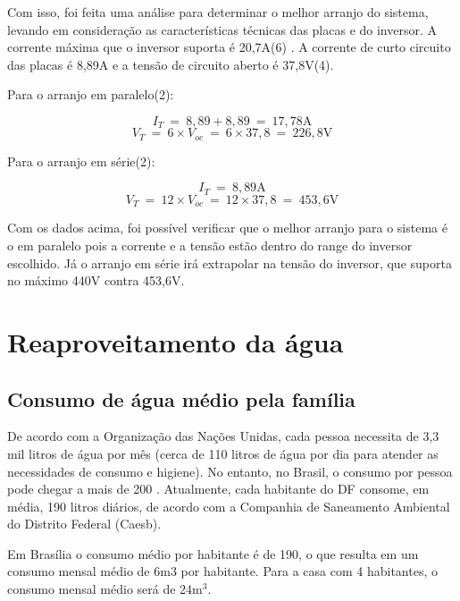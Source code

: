 	Com isso, foi feita uma análise para determinar o melhor arranjo do sistema, levando em consideração as características técnicas das placas e do inversor. A corrente máxima que o inversor suporta é 20,7\si{\ampere}(6) . A corrente de curto circuito das placas é 8,89\si{\ampere} e a tensão de circuito aberto é 37,8\si{\volt}(4).

	Para o arranjo em paralelo(2):
	
	$$I_T\ =\ 8,89 + 8,89\ =\ 17,78\si{\ampere}$$
	$$V_T\ =\ 6\times V_{oc}\ =\ 6\times37,8\ =\ 226,8\si{\volt}$$

	Para o arranjo em série(2):
	
	$$I_T\ =\ 8,89\si{\ampere}$$
	$$V_T\ =\ 12\times V_{oc}\ =\ 12\times37,8\ =\ 453,6\si{\volt}$$

	Com os dados acima, foi possível verificar que o melhor arranjo para o sistema é o em paralelo pois a corrente e a tensão estão dentro do range do inversor escolhido. Já o arranjo em série irá extrapolar na tensão do inversor, que suporta no máximo 440\si{\volt} contra 453,6\si{\volt}.


\section{Reaproveitamento da água}

\subsection{Consumo de água médio pela família}

	De acordo com a Organização das Nações Unidas, cada pessoa necessita de 3,3 mil litros de água por mês (cerca de 110 litros de água por dia para atender as necessidades de consumo e higiene). No entanto, no Brasil, o consumo por pessoa pode chegar a mais de 200 . Atualmente, cada habitante do DF consome, em média, 190 litros diários, de acordo com a Companhia de Saneamento Ambiental do Distrito Federal (Caesb).
	
	Em Brasília o consumo médio por habitante é de 190, o que resulta em um consumo mensal médio de 6m3 por habitante. Para a casa com 4 habitantes, o consumo mensal médio será de 24\si{\meter}$^3$.

